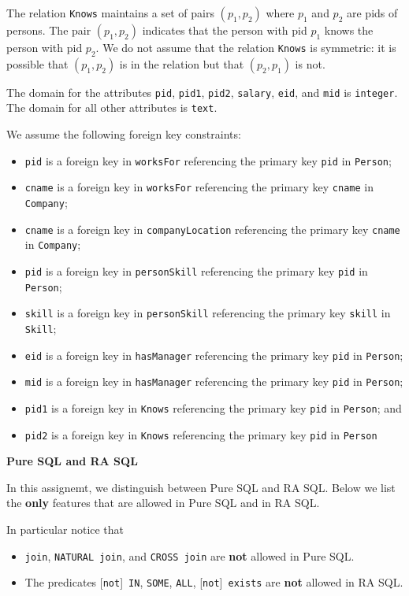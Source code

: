 \documentclass[11pt]{article}
\begin{document}
The relation {\tt Knows} maintains a set of pairs $(p_1,p_2)$ where $p_1$ 
and $p_2$ are pids of persons.   The pair $(p_1,p_2)$ indicates that the person with
pid $p_1$ knows the person with pid $p_2$.
We do not assume that the relation {\tt Knows} is
symmetric: it is possible that $(p_1,p_2)$ is in the relation but that
$(p_2,p_1)$ is not.

The domain for the attributes {\tt pid}, {\tt pid1}, {\tt pid2}, {\tt salary}, {\tt eid}, and {\tt mid} is {\tt integer}.   The domain for all other attributes is {\tt text}.

We assume the following foreign key constraints:
\begin{itemize}
\item {\tt pid} is a foreign key in {\tt worksFor} referencing the primary key {\tt pid} in {\tt Person};
\item {\tt cname} is a foreign key in {\tt worksFor} referencing the primary key {\tt cname} in {\tt Company};
\item {\tt cname} is a foreign key in {\tt companyLocation} referencing the primary key {\tt cname} in {\tt Company};
\item {\tt pid} is a foreign key in {\tt personSkill} referencing the primary key {\tt pid} in {\tt Person};
\item {\tt skill} is a foreign key in {\tt personSkill} referencing the primary key {\tt skill} in {\tt Skill};
\item {\tt eid} is a foreign key in {\tt hasManager} referencing the primary key {\tt pid} in {\tt Person}; 
\item {\tt mid} is a foreign key in {\tt hasManager} referencing the primary key {\tt pid} in {\tt Person};
\item {\tt pid1} is a foreign key in {\tt Knows} referencing the primary key {\tt pid} in {\tt Person}; and
\item {\tt pid2} is a foreign key in {\tt Knows} referencing the primary key {\tt pid} in {\tt Person}
\end{itemize}

\newpage

\noindent
\large{\bf Pure SQL and RA SQL}

\bigskip
In this assignemt, we distinguish between Pure SQL and RA SQL.
Below we list the {\bf only} features that are allowed in Pure SQL and in RA SQL. 

In particular notice that 
\begin{itemize}
\item {\tt join}, {\tt NATURAL~join}, and {\tt CROSS~join} are {\bf not} allowed in Pure SQL.
\item The predicates  [{\tt not}]~{\tt IN}, {\tt SOME}, {\tt ALL}, [{\tt not}]~{\tt exists} are {\bf not} allowed in RA SQL.
\end{itemize}
\end{document}
